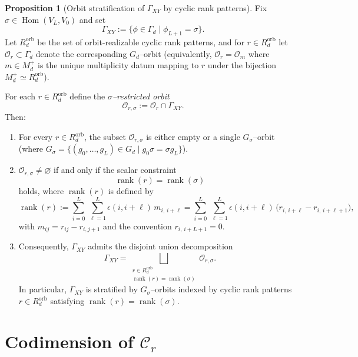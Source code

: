 \documentclass{article}
\newcommand{\Hom}{\operatorname{Hom}}
\newcommand{\rank}{\operatorname{rank}}
\theoremstyle{definition}
\newtheorem{proposition}[theorem]{Proposition}
\begin{document}
\begin{proposition}[Orbit stratification of $\Gamma_{XY}$ by cyclic rank patterns]\label{prop:GammaXY_orbit_stratification}
Fix $\sigma\in\Hom(V_L,V_0)$ and set
\[
\Gamma_{XY}:=\{\phi\in\Gamma_d\mid \phi_{L+1}=\sigma\}.
\]
Let $R_d^{\mathrm{orb}}$ be the set of orbit-realizable cyclic rank patterns, and for
$r\in R_d^{\mathrm{orb}}$ let $\mathcal O_r\subset \Gamma_d$ denote the corresponding
$G_d$--orbit (equivalently, $\mathcal O_r=\mathcal O_m$ where $m\in M_d^+$ is the unique
multiplicity datum mapping to $r$ under the bijection $M_d^+\simeq R_d^{\mathrm{orb}}$).

For each $r\in R_d^{\mathrm{orb}}$ define the \emph{$\sigma$--restricted orbit}
\[
\mathcal O_{r,\sigma}:=\mathcal O_r\cap \Gamma_{XY}.
\]
Then:
\begin{enumerate}
\item For every $r\in R_d^{\mathrm{orb}}$, the subset $\mathcal O_{r,\sigma}$ is either empty
or a single $G_\sigma$--orbit (where $G_\sigma=\{(g_0,\dots,g_L)\in G_d\mid g_0\sigma=\sigma g_L\}$).
\item $\mathcal O_{r,\sigma}\neq\varnothing$ if and only if the scalar constraint
\[
\rank(r)=\rank(\sigma)
\]
holds, where $\rank(r)$ is defined by
\begin{equation}\label{eq:rank_of_rankpattern}
\rank(r)
:=
\sum_{i=0}^L\ \sum_{\ell=1}^L \epsilon(i,i+\ell)\,m_{i,\,i+\ell}
=
\sum_{i=0}^L\ \sum_{\ell=1}^L \epsilon(i,i+\ell)\,\bigl(r_{i,\,i+\ell}-r_{i,\,i+\ell+1}\bigr),
\end{equation}
with $m_{ij}=r_{ij}-r_{i,j+1}$ and the convention $r_{i,\,i+L+1}=0$.
\item Consequently, $\Gamma_{XY}$ admits the disjoint union decomposition
\begin{equation}\label{eq:GammaXY_disjoint_union}
\Gamma_{XY}
=
\bigsqcup_{\substack{r\in R_d^{\mathrm{orb}}\\ \rank(r)=\rank(\sigma)}}
\mathcal O_{r,\sigma}.
\end{equation}
In particular, $\Gamma_{XY}$ is stratified by $G_\sigma$--orbits indexed by cyclic rank patterns
$r\in R_d^{\mathrm{orb}}$ satisfying $\rank(r)=\rank(\sigma)$.
\end{enumerate}
\end{proposition}
\section{Codimension of $\mathcal{C}_r$}
\end{document}
